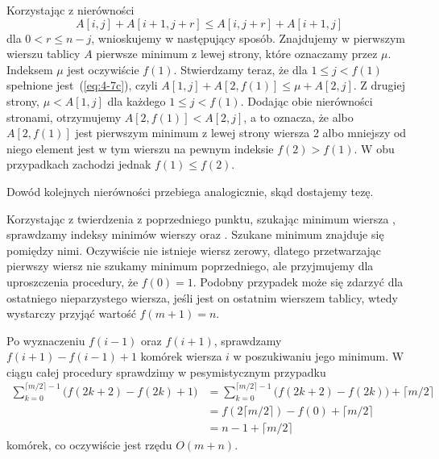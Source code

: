 \subproblem %
Korzystając z nierówności
\begin{equation}
	A[i,j]+A[i+1,j+r] \le A[i,j+r]+A[i+1,j] \label{eq:4-7c}
\end{equation}
dla $0<r\le n-j$, wnioskujemy w następujący sposób. Znajdujemy w pierwszym wierszu tablicy $A$ pierwsze minimum z lewej strony, które oznaczamy przez $\mu$. Indeksem $\mu$ jest oczywiście $f(1)$. Stwierdzamy teraz, że dla $1\le j<f(1)$ spełnione jest~(\ref{eq:4-7c}), czyli $A[1,j]+A[2,f(1)]\le\mu+A[2,j]$. Z drugiej strony, $\mu<A[1,j]$ dla każdego $1\le j<f(1)$. Dodając obie nierówności stronami, otrzymujemy $A[2,f(1)]<A[2,j]$, a to oznacza, że albo $A[2,f(1)]$ jest pierwszym minimum z lewej strony wiersza 2 albo mniejszy od niego element jest w tym wierszu na pewnym indeksie $f(2)>f(1)$. W obu przypadkach zachodzi jednak $f(1)\le f(2)$.

Dowód kolejnych nierówności przebiega analogicznie, skąd dostajemy tezę.

\subproblem %
Korzystając z twierdzenia z poprzedniego punktu, szukając minimum wiersza , sprawdzamy indeksy minimów wierszy  oraz . Szukane minimum znajduje się pomiędzy nimi. Oczywiście nie istnieje wiersz zerowy, dlatego przetwarzając pierwszy wiersz nie szukamy minimum poprzedniego, ale przyjmujemy dla uproszczenia procedury, że $f(0)=1$. Podobny przypadek może się zdarzyć dla ostatniego nieparzystego wiersza, jeśli jest on ostatnim wierszem tablicy, wtedy wystarczy przyjąć wartość $f(m+1)=n$.

Po wyznaczeniu $f(i-1)$ oraz $f(i+1)$, sprawdzamy $f(i+1)-f(i-1)+1$ komórek wiersza $i$ w poszukiwaniu jego minimum. W ciągu całej procedury sprawdzimy w pesymistycznym przypadku
\begin{align*}
	\sum_{k=0}^{\lceil m/2\rceil-1}\bigl(f(2k+2)-f(2k)+1\bigr) &= \sum_{k=0}^{\lceil m/2\rceil-1}\bigl(f(2k+2)-f(2k))+\lceil m/2\rceil \\
	&= f(2\lceil m/2\rceil)-f(0)+\lceil m/2\rceil \\[2mm]
	&= n-1+\lceil m/2\rceil
\end{align*}
komórek, co oczywiście jest rzędu $O(m+n)$.

